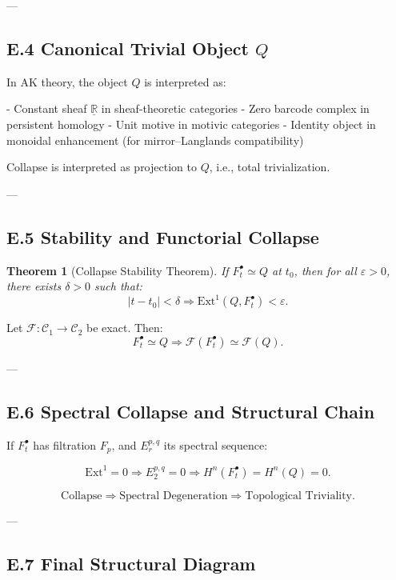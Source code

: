 \documentclass[11pt]{article}
\newtheorem{theorem}{Theorem}[section]
\begin{document}
---

\subsection*{E.4 Canonical Trivial Object $Q$}

In AK theory, the object $Q$ is interpreted as:

- Constant sheaf $\underline{\mathbb{R}}$ in sheaf-theoretic categories
- Zero barcode complex in persistent homology
- Unit motive in motivic categories
- Identity object in monoidal enhancement (for mirror–Langlands compatibility)

Collapse is interpreted as projection to $Q$, i.e., total trivialization.

---

\subsection*{E.5 Stability and Functorial Collapse}

\begin{theorem}[Collapse Stability Theorem]
If $F^\bullet_t \simeq Q$ at $t_0$, then for all $\varepsilon > 0$, there exists $\delta > 0$ such that:
\[
|t - t_0| < \delta \Rightarrow \mathrm{Ext}^1(Q, F^\bullet_t) < \varepsilon.
\]
\end{theorem}

\begin{proposition}[Functoriality]
Let $\mathcal{F} : \mathcal{C}_1 \to \mathcal{C}_2$ be exact. Then:
\[
F^\bullet_t \simeq Q \Rightarrow \mathcal{F}(F^\bullet_t) \simeq \mathcal{F}(Q).
\]
\end{proposition}

---

\subsection*{E.6 Spectral Collapse and Structural Chain}

If $F^\bullet_t$ has filtration $F_p$, and $E_r^{p,q}$ its spectral sequence:

\[
\mathrm{Ext}^1 = 0 \Rightarrow E_2^{p,q} = 0 \Rightarrow H^n(F^\bullet_t) = H^n(Q) = 0.
\]

\[
\text{Collapse} \Rightarrow \text{Spectral Degeneration} \Rightarrow \text{Topological Triviality}.
\]

---

\subsection*{E.7 Final Structural Diagram}
\end{document}
